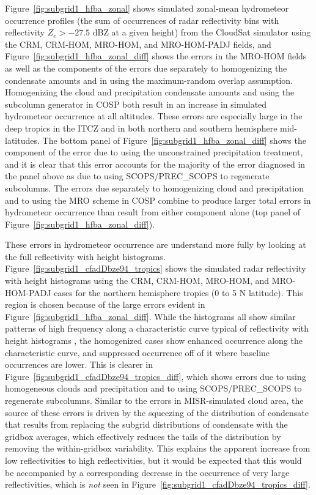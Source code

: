 Figure~\ref{fig:subgrid1_hfba_zonal} shows simulated zonal-mean
hydrometeor occurrence profiles (the sum of occurrences of radar
reflectivity bins with reflectivity \(Z_e > -27.5\) dBZ at a given
height) from the CloudSat simulator using the CRM, CRM-HOM, MRO-HOM, and
MRO-HOM-PADJ fields, and Figure~\ref{fig:subgrid1_hfba_zonal_diff} shows
the errors in the MRO-HOM fields as well as the components of the errors
due separately to homogenizing the condensate amounts and in using the
maximum-random overlap assumption. Homogenizing the cloud and
precipitation condensate amounts and using the subcolumn generator in
COSP both result in an increase in simulated hydrometeor occurrence at
all altitudes. These errors are especially large in the deep tropics in
the ITCZ and in both northern and southern hemisphere mid-latitudes. The
bottom panel of Figure~\ref{fig:subgrid1_hfba_zonal_diff} shows the
component of the error due to using the unconstrained precipitation
treatment, and it is clear that this error accounts for the majority of
the error diagnosed in the panel above as due to using SCOPS/PREC\_SCOPS
to regenerate subcolumns. The errors due separately to homogenizing
cloud and precipitation and to using the MRO scheme in COSP combine to
produce larger total errors in hydrometeor occurrence than result from
either component alone (top panel of
Figure~\ref{fig:subgrid1_hfba_zonal_diff}).

These errors in hydrometeor occurrence are understand more fully by
looking at the full reflectivity with height histograms.
Figure~\ref{fig:subgrid1_cfadDbze94_tropics} shows the simulated radar
reflectivity with height histograms using the CRM, CRM-HOM, MRO-HOM, and
MRO-HOM-PADJ cases for the northern hemisphere tropics (0 to 5 N
latitude). This region is chosen because of the large errors evident in
Figure~\ref{fig:subgrid1_hfba_zonal_diff}. While the histograms all show
similar patterns of high frequency along a characteristic curve typical
of reflectivity with height histograms
\citep[e.g.;][]{marchand_et_al_2009}, the homogenized cases show
enhanced occurrence along the characteristic curve, and suppressed
occurrence off of it where baseline occurrences are lower. This is
clearer in Figure~\ref{fig:subgrid1_cfadDbze94_tropics_diff}, which
shows errors due to using homogeneous clouds and precipitation and to
using SCOPS/PREC\_SCOPS to regenerate subcolumns. Similar to the errors
in MISR-simulated cloud area, the source of these errors is driven by
the squeezing of the distribution of condensate that results from
replacing the subgrid distributions of condensate with the gridbox
averages, which effectively reduces the tails of the distribution by
removing the within-gridbox variability. This explains the apparent
increase from low reflectivities to high reflectivities, but it would be
expected that this would be accompanied by a corresponding decrease in
the occurrence of very large reflectivities, which is \emph{not} seen in
Figure~\ref{fig:subgrid1_cfadDbze94_tropics_diff}.

